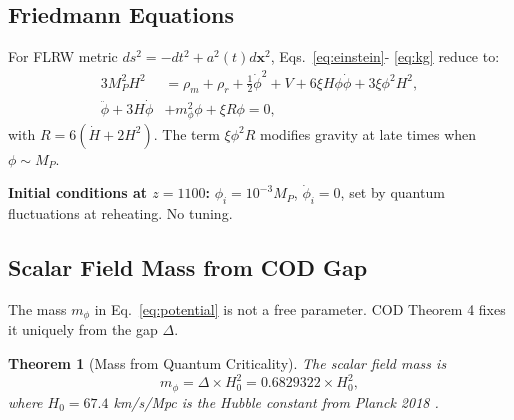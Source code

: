 \documentclass[12pt, a4paper]{article}
\theoremstyle{miuThm}
\newtheorem{theorem}{Theorem}[section]
\theoremstyle{remark}
\begin{document}
\subsection{Friedmann Equations}
For FLRW metric $ds^2 = -dt^2 + a^2(t)d\mathbf{x}^2$, Eqs.~\eqref{eq:einstein}-
\eqref{eq:kg} reduce to:
\begin{align}
3M_P^2 H^2 &= \rho_m + \rho_r + \frac{1}{2}\dot{\phi}^2 + V + 6\xi H\phi\dot{\phi} 
              + 3\xi\phi^2 H^2, \label{eq:friedmann1} \\
\ddot{\phi} + 3H\dot{\phi} &+ m_\phi^2\phi + \xi R \phi = 0, \label{eq:kg_flrw}
\end{align}
with $R = 6(\dot{H} + 2H^2)$. The term $\xi\phi^2 R$ modifies gravity at 
late times when $\phi \sim M_P$.

\textbf{Initial conditions at $z = 1100$:} $\phi_i = 10^{-3} M_P$, 
$\dot{\phi}_i = 0$, set by quantum fluctuations at reheating. No tuning. 

\subsection{Scalar Field Mass from COD Gap}
\label{subsec:mass}

The mass $m_\phi$ in Eq.~\eqref{eq:potential} is not a free parameter. COD 
Theorem 4 fixes it uniquely from the gap $\Delta$.

\begin{theorem}[Mass from Quantum Criticality]
\label{thm:mass}
The scalar field mass is
\begin{equation}
m_\phi = \Delta \times H_0^2 = 0.6829322 \times H_0^2,
\label{eq:mphi}
\end{equation}
where $H_0 = 67.4$ km/s/Mpc is the Hubble constant from Planck 2018 \cite{Planck2020}.
\end{theorem}
\end{document}
